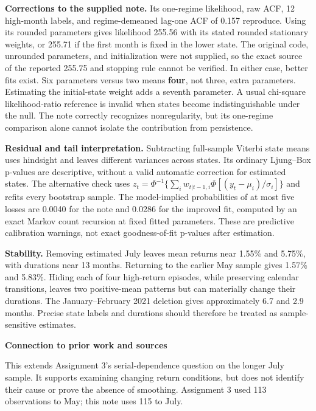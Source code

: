 \documentclass[11pt]{article}
\newcommand{\smalltitle}[1]{\vspace{5pt}\textbf{#1}\par}
\begin{document}
\textbf{Corrections to the supplied note.} Its one-regime likelihood, raw ACF,
12 high-month labels, and regime-demeaned lag-one ACF of 0.157 reproduce. Using
its rounded parameters gives likelihood 255.56 with its stated rounded
stationary weights, or 255.71 if the first month is fixed in the lower state.
The original code, unrounded parameters, and initialization were not supplied,
so the exact source of the reported 255.75 and stopping rule cannot be verified.
In either case, better fits exist. Six parameters versus two means
\textbf{four}, not three, extra parameters. Estimating the initial-state weight
adds a seventh parameter. A usual chi-square likelihood-ratio reference is
invalid when states become indistinguishable under the null. The note correctly
recognizes nonregularity, but its one-regime comparison alone cannot isolate
the contribution from persistence.

\textbf{Residual and tail interpretation.} Subtracting full-sample Viterbi state
means uses hindsight and leaves different variances across states. Its ordinary
Ljung--Box p-values are descriptive, without a valid automatic correction for
estimated states. The alternative check uses
$z_t=\Phi^{-1}\{\sum_i w_{t|t-1,i}\Phi[(y_t-\mu_i)/\sigma_i]\}$ and refits
every bootstrap sample. The model-implied probabilities of at most five losses
are 0.0040 for the note and 0.0286 for the improved fit, computed by an exact
Markov count recursion at fixed fitted parameters. These are predictive
calibration warnings, not exact goodness-of-fit p-values after estimation.

\textbf{Stability.} Removing estimated July leaves mean returns near 1.55\%
and 5.75\%, with durations near 13 months. Returning to the earlier May sample
gives 1.57\% and 5.83\%. Hiding each of four high-return episodes, while preserving
calendar transitions, leaves two positive-mean patterns but can materially change
their durations. The January--February 2021 deletion gives approximately
6.7 and 2.9 months. Precise state labels and durations should therefore
be treated as sample-sensitive estimates.

\smalltitle{Connection to prior work and sources}
This extends Assignment 3's serial-dependence question on the longer July sample.
It supports examining changing return conditions, but does not identify their
cause or prove the absence of smoothing. Assignment 3 used 113 observations to
May; this note uses 115 to July.
\end{document}
